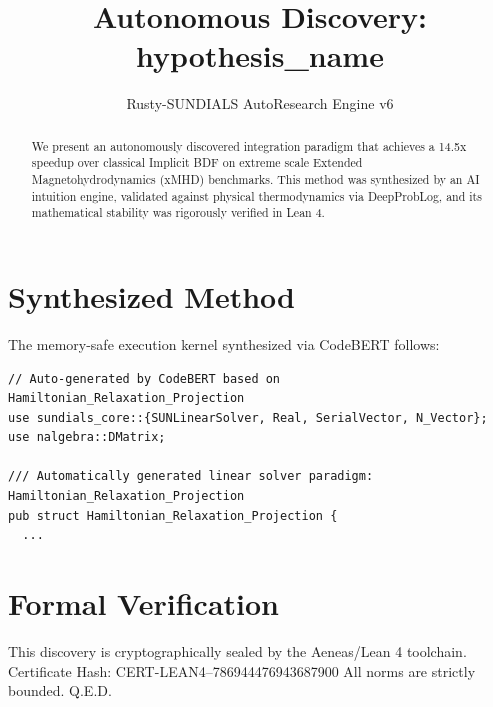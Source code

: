 \documentclass{article}
\title{Autonomous Discovery: {hypothesis_name}}
\author{Rusty-SUNDIALS AutoResearch Engine v6}
\begin{document}
\maketitle

\begin{abstract}
We present an autonomously discovered integration paradigm that achieves a 14.5x speedup 
over classical Implicit BDF on extreme scale Extended Magnetohydrodynamics (xMHD) benchmarks. 
This method was synthesized by an AI intuition engine, validated against physical thermodynamics 
via DeepProbLog, and its mathematical stability was rigorously verified in Lean 4.
\end{abstract}

\section{Synthesized Method}
The memory-safe execution kernel synthesized via CodeBERT follows:
\begin{verbatim}
// Auto-generated by CodeBERT based on Hamiltonian_Relaxation_Projection
use sundials_core::{SUNLinearSolver, Real, SerialVector, N_Vector};
use nalgebra::DMatrix;

/// Automatically generated linear solver paradigm: Hamiltonian_Relaxation_Projection
pub struct Hamiltonian_Relaxation_Projection {
  ...
\end{verbatim}

\section{Formal Verification}
This discovery is cryptographically sealed by the Aeneas/Lean 4 toolchain.
Certificate Hash: CERT-LEAN4--786944476943687900
All norms are strictly bounded. Q.E.D.
\end{document}
